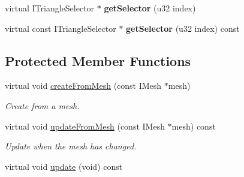 \begin{DoxyCompactItemize}
\item 
\hypertarget{classirr_1_1scene_1_1_c_triangle_selector_a0b9ec26de427566426792f1d1c084b38}{virtual I\-Triangle\-Selector $\ast$ {\bfseries get\-Selector} (u32 index)}\label{classirr_1_1scene_1_1_c_triangle_selector_a0b9ec26de427566426792f1d1c084b38}

\item 
\hypertarget{classirr_1_1scene_1_1_c_triangle_selector_a9f45021ec9483bdad3445f45e0890b7e}{virtual const I\-Triangle\-Selector $\ast$ {\bfseries get\-Selector} (u32 index) const }\label{classirr_1_1scene_1_1_c_triangle_selector_a9f45021ec9483bdad3445f45e0890b7e}

\end{DoxyCompactItemize}
\subsection*{Protected Member Functions}
\begin{DoxyCompactItemize}
\item 
\hypertarget{classirr_1_1scene_1_1_c_triangle_selector_a21f0ca19ed9d97544279196254d678eb}{virtual void \hyperlink{classirr_1_1scene_1_1_c_triangle_selector_a21f0ca19ed9d97544279196254d678eb}{create\-From\-Mesh} (const I\-Mesh $\ast$mesh)}\label{classirr_1_1scene_1_1_c_triangle_selector_a21f0ca19ed9d97544279196254d678eb}

\begin{DoxyCompactList}\small\item\em Create from a mesh. \end{DoxyCompactList}\item 
\hypertarget{classirr_1_1scene_1_1_c_triangle_selector_abc58752f7b13ad94c05fd1c1bc248abf}{virtual void \hyperlink{classirr_1_1scene_1_1_c_triangle_selector_abc58752f7b13ad94c05fd1c1bc248abf}{update\-From\-Mesh} (const I\-Mesh $\ast$mesh) const }\label{classirr_1_1scene_1_1_c_triangle_selector_abc58752f7b13ad94c05fd1c1bc248abf}

\begin{DoxyCompactList}\small\item\em Update when the mesh has changed. \end{DoxyCompactList}\item 
virtual void \hyperlink{classirr_1_1scene_1_1_c_triangle_selector_a76de316a9754415425740357e8c0d6f7}{update} (void) const 
\end{DoxyCompactItemize}
